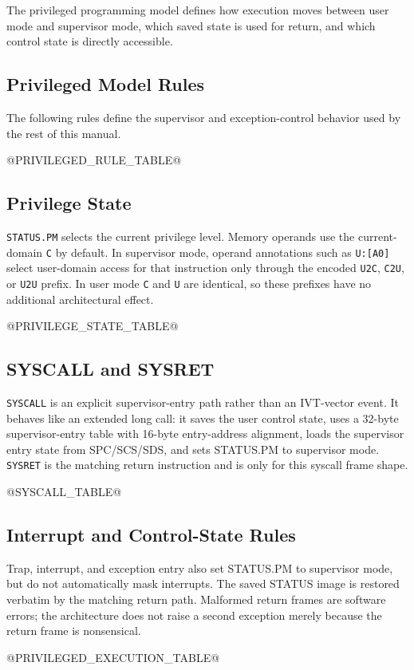 The privileged programming model defines how execution moves between user mode and supervisor mode,
which saved state is used for return, and which control state is directly accessible.

\subsection{Privileged Model Rules}
The following rules define the supervisor and exception-control behavior used by the rest of this manual.

@PRIVILEGED_RULE_TABLE@

\subsection{Privilege State}
\texttt{STATUS.PM} selects the current privilege level. Memory operands use the current-domain \texttt{C}
by default. In supervisor mode, operand annotations such as \texttt{U:[A0]} select user-domain
access for that instruction only through the encoded \texttt{U2C}, \texttt{C2U}, or \texttt{U2U} prefix.
In user mode \texttt{C} and \texttt{U} are identical, so these prefixes have no additional
architectural effect.

@PRIVILEGE_STATE_TABLE@

\subsection{SYSCALL and SYSRET}
\texttt{SYSCALL} is an explicit supervisor-entry path rather than an IVT-vector event. It behaves like an
extended long call: it saves the user control state, uses a 32-byte supervisor-entry table with 16-byte
entry-address alignment, loads the supervisor entry state from SPC/SCS/SDS, and sets STATUS.PM to
supervisor mode. \texttt{SYSRET} is the matching return instruction and is only for this syscall frame shape.

@SYSCALL_TABLE@

\subsection{Interrupt and Control-State Rules}
Trap, interrupt, and exception entry also set STATUS.PM to supervisor mode, but do not automatically mask
interrupts. The saved STATUS image is restored verbatim by the matching return path. Malformed return
frames are software errors; the architecture does not raise a second exception merely because the return
frame is nonsensical.

@PRIVILEGED_EXECUTION_TABLE@
